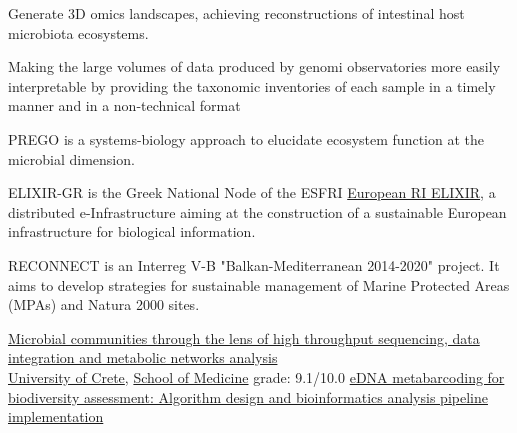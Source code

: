 \documentclass[
	a4paper,
]{fortysecondscv}
\begin{document}
\makefrontsidebar

\begin{cvtable}[3]

	{Generate 3D omics landscapes, achieving reconstructions of intestinal host microbiota ecosystems.}

	{Making the large volumes of data produced by genomi observatories more easily interpretable by providing the taxonomic inventories of each sample in a timely manner and in a non-technical format}


	{PREGO is a systems-biology approach to elucidate ecosystem function at the microbial dimension.}
	
	{ELIXIR-GR is the Greek National Node of the ESFRI \href{https://elixir-europe.org/}{European RI ELIXIR}, a distributed e-Infrastructure aiming at the construction of a sustainable European infrastructure for biological information.}
	
	{RECONNECT is an Interreg V-B "Balkan-Mediterranean 2014-2020" project. It aims to develop strategies for sustainable management of Marine Protected Areas (MPAs) and Natura 2000 sites.}

\end{cvtable}



\begin{cvtable}[1.5]
		{\href{https://www.openarchives.gr/aggregator-openarchives/edm/elocus/000018-dlib_5_7_d_metadata-dlib-1661248925-407543-18532.tkl?language=en}{Microbial communities through the lens of high throughput sequencing, data integration and metabolic networks analysis}}
	\\
	{\href{https://en.uoc.gr/}{University of Crete}, \href{http://www.english.med.uoc.gr/}{School of Medicine}}
		{grade: 9.1/10.0}
	    {\href{https://www.openarchives.gr/aggregator-openarchives/edm/elocus/000018-dlib_5_2_f_metadata-dlib-1545038085-364284-26948.tkl}{eDNA metabarcoding for biodiversity assessment: Algorithm design and bioinformatics analysis pipeline implementation}}

\end{cvtable}
\end{document}
